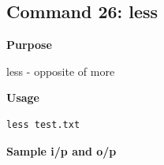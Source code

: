 \subsection{Command 26: less} 
\textbf{Purpose}
\begin{flushleft}
       less - opposite of more
\end{flushleft}
\textbf{Usage}
\begin{verbatim}
less test.txt
\end{verbatim}
\textbf{Sample i/p and o/p}
\begin{figure}[H] 
\end{figure}
